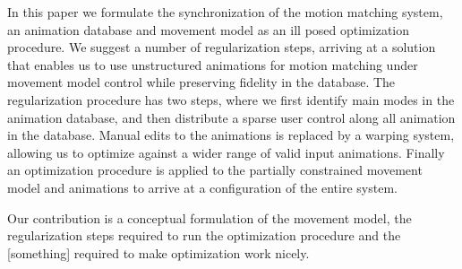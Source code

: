 In this paper we formulate the synchronization of the motion matching system, an animation database and movement model as an ill posed optimization procedure. We suggest a number of regularization steps, arriving at a solution that enables us to use unstructured animations for motion matching under movement model control while preserving fidelity in the database. The regularization procedure has two steps, where we first identify main modes in the animation database, and then distribute a sparse user control along all animation in the database. Manual edits to the animations is replaced by a warping system, allowing us to optimize against a wider range of valid input animations. Finally an optimization procedure is applied to the partially constrained movement model and animations to arrive at a configuration of the entire system.

Our contribution is a conceptual formulation of the movement model, the regularization steps required to run the optimization procedure and the [something] required to make optimization work nicely.
